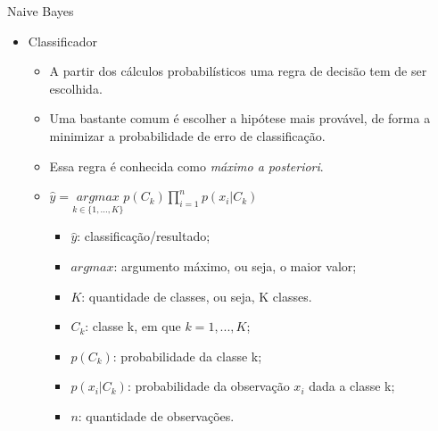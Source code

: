 \documentclass{libs/ufc_format}
\begin{document}
\begin{frame}{Naive Bayes}
    \begin{itemize}
        \item Classificador
            \begin{itemize}
                \justifying
                \item A partir dos cálculos probabilísticos uma \alert<2->{regra de decisão} tem de ser escolhida.
                \item<2-> Uma bastante comum é escolher a hipótese mais provável, de forma a minimizar a probabilidade de erro de classificação.
                \item<3-> Essa regra é conhecida como \textit{máximo a posteriori}.
                \item<4-> $\hat{y} = \underset{k \in \{1,...,K\}}{argmax}p(C_{k})\prod\limits^{n}_{i = 1}p(x_{i} | C_{k})$
                    \begin{itemize}
                        \justifying
                        \item<5> $\hat{y}$: classificação/resultado;
                        \item<5> $argmax$: argumento máximo, ou seja, o maior valor;
                        \item<5> $K$: quantidade de classes, ou seja, K classes.
                        \item<5> $C_{k}$: classe k, em que $k=1,...,K$;
                        \item<5> $p(C_{k})$: probabilidade da classe k;
                        \item<5> $p(x_{i} | C_{k})$: probabilidade da observação $x_{i}$ dada a classe k;
                        \item<5> $n$: quantidade de observações.
                    \end{itemize}
            \end{itemize}
    \end{itemize}
\end{frame}
\end{document}
